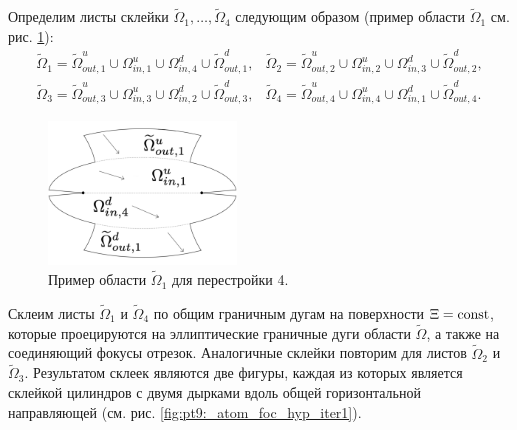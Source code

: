 Определим листы склейки $\widetilde{\Omega}_1, \ldots, \widetilde{\Omega}_4$ следующим образом (пример области $\widetilde{\Omega}_1$ см. рис. \ref{fig:pt9:_atom_4_domain}):
\begin{equation}
\begin{array}{cc}
\widetilde{\Omega}_1 = \widetilde{\Omega}_{out, 1}^u \cup \Omega_{in, 1}^u \cup \Omega_{in, 4}^d \cup \widetilde{\Omega}_{out, 1}^d, &
\widetilde{\Omega}_2 = \widetilde{\Omega}_{out, 2}^u \cup \Omega_{in, 2}^u \cup \Omega_{in, 3}^d \cup \widetilde{\Omega}_{out, 2}^d, \\
\widetilde{\Omega}_3 = \widetilde{\Omega}_{out, 3}^u \cup \Omega_{in, 3}^u \cup \Omega_{in, 2}^d \cup \widetilde{\Omega}_{out, 3}^d, &
\widetilde{\Omega}_4 = \widetilde{\Omega}_{out, 4}^u \cup \Omega_{in, 4}^u \cup \Omega_{in, 1}^d \cup \widetilde{\Omega}_{out, 4}^d.
\end{array}
\label{eq:case4Omegas}
\end{equation}
\begin{figure}[!htb]
\centering
\includegraphics[width=5cm]{images/ch4/section2/atoms/atom_4_domain.pdf}
    \caption{Пример области $\widetilde{\Omega}_1$ для перестройки 4.}
    \label{fig:pt9:_atom_4_domain}
\end{figure}


Склеим листы $\widetilde{\Omega}_1$ и  $\widetilde{\Omega}_4$ по общим граничным дугам на поверхности $\Xi = \mathrm{const}$, которые проецируются на эллиптические граничные дуги области $\widetilde{\Omega}$, а также на  
соединяющий фокусы отрезок. Аналогичные склейки повторим для листов $\widetilde{\Omega}_2$ и  $\widetilde{\Omega}_3$. Результатом склеек являются две фигуры, каждая из которых является склейкой цилиндров с двумя дырками вдоль общей горизонтальной направляющей (см. рис. \ref{fig:pt9:_atom_foc_hyp_iter1}).


